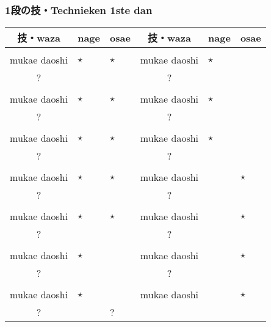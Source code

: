\subsubsection{1段の技・Technieken 1ste dan}
\begin{table}[H]
\begin{center}
\begin{tabular}{c|p{0.5cm}|p{0.5cm}|c|p{0.5cm}|p{0.5cm}}
    技・waza & nage & osae & 技・waza & nage & osae\\
    \hline
    \ruby{}{}\ruby{}{} &  &  & \ruby{}{}\ruby{}{} &  & \\
    mukae daoshi & $\star$ & $\star$ & mukae daoshi & $\star$ & \\
    ? &  &  & ? &  & \\
    \hline
    \ruby{}{}\ruby{}{} &  &  & \ruby{}{}\ruby{}{} &  & \\
    mukae daoshi & $\star$ & $\star$ & mukae daoshi & $\star$ & \\
    ? &  &  & ? &  & \\
    \hline
    \ruby{}{}\ruby{}{} &  &  & \ruby{}{}\ruby{}{} &  & \\
    mukae daoshi & $\star$ & $\star$ & mukae daoshi & $\star$ & \\
    ? &  &  & ? &  & \\
    \hline
    \ruby{}{}\ruby{}{} &  &  & \ruby{}{}\ruby{}{} &  & \\
    mukae daoshi & $\star$ & $\star$ & mukae daoshi &  & $\star$\\
    ? &  &  & ? &  & \\
    \hline
    \ruby{}{}\ruby{}{} &  &  & \ruby{}{}\ruby{}{} &  & \\
    mukae daoshi & $\star$ & $\star$ & mukae daoshi &  & $\star$\\
    ? &  &  & ? &  & \\
    \hline
    \ruby{}{}\ruby{}{} &  &  & \ruby{}{}\ruby{}{} &  & \\
    mukae daoshi & $\star$ &  & mukae daoshi &  & $\star$\\
    ? &  &  & ? &  & \\
    \hline
    \ruby{}{}\ruby{}{} &  &  & \ruby{}{}\ruby{}{} &  & \\
    mukae daoshi & $\star$ &  & mukae daoshi &  & $\star$\\
    ? &  & ? &  & 
\end{tabular}
\end{center}
\label{dan_1_kihonnagewaza}
\end{table}

